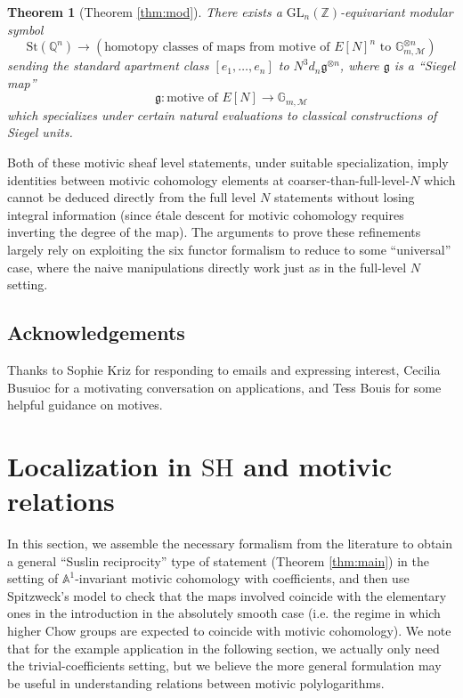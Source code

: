 \documentclass[a4paper,reqno,11pt]{amsart}
\theoremstyle{plain}
\newtheorem{theorem}{Theorem}[section]
\theoremstyle{definition}
\theoremstyle{remark}
\newcommand{\Z}{\mathbb{Z}}
\newcommand{\Q}{\mathbb{Q}}
\newcommand{\A}{\mathbb{A}}
\newcommand{\G}{\mathbb{G}}
\newcommand{\SH}{\mathrm{SH}}
\newcommand{\GL}{\mathrm{GL}}
\begin{document}
\begin{theorem}[Theorem \ref{thm:mod}]
    There exists a $\GL_n(\Z)$-equivariant modular symbol
    \[
    \mathrm{St}(\Q^n) \to (\text{homotopy classes of maps from motive of }E[N]^n\text{ to } \G_{m,\mathcal{M}}^{\otimes n})
    \]
    sending the standard apartment class $[e_1,\ldots, e_n]$ to $N^3 d_n\mathfrak{g}^{\otimes n}$, where $\mathfrak{g}$ is a ``Siegel map'' 
    \[
    \mathfrak{g}:\text{motive of }E[N] \to \G_{m,\mathcal{M}}
    \]
    which specializes under certain natural evaluations to classical constructions of Siegel units.
\end{theorem}

Both of these motivic sheaf level statements, under suitable specialization, imply identities between motivic cohomology elements at coarser-than-full-level-$N$ which cannot be deduced directly from the full level $N$ statements without losing integral information (since \'{e}tale descent for motivic cohomology requires inverting the degree of the map). The arguments to prove these refinements largely rely on exploiting the six functor formalism to reduce to some ``universal'' case, where the naive manipulations directly work just as in the full-level $N$ setting.

\subsection{Acknowledgements} Thanks to Sophie Kriz for responding to emails and expressing interest, Cecilia Busuioc for a motivating conversation on applications, and Tess Bouis for some helpful guidance on motives.

\section{Localization in $\SH$ and motivic relations}

In this section, we assemble the necessary formalism from the literature to obtain a general ``Suslin reciprocity'' type of statement (Theorem \ref{thm:main}) in the setting of $\A^1$-invariant motivic cohomology with coefficients, and then use Spitzweck's model to check that the maps involved coincide with the elementary ones in the introduction in the absolutely smooth case (i.e. the regime in which higher Chow groups are expected to coincide with motivic cohomology). We note that for the example application in the following section, we actually only need the trivial-coefficients setting, but we believe the more general formulation may be useful in understanding relations between motivic polylogarithms.
\end{document}
